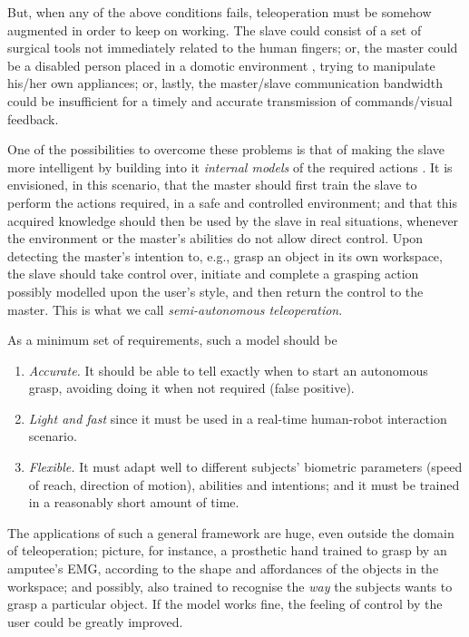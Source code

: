 \documentclass[a4paper,10pt,conference]{ieeeconf}
\begin{document}
But, when any of the above conditions fails, teleoperation must be
somehow augmented in order to keep on working. The slave could consist
of a set of surgical tools \cite{...} not immediately related to the
human fingers; or, the master could be a disabled person placed in a
domotic environment \cite{...}, trying to manipulate his/her own
appliances; or, lastly, the master/slave communication bandwidth could
be insufficient for a timely and accurate transmission of
commands/visual feedback.

One of the possibilities to overcome these problems is that of making
the slave more intelligent by building into it \emph{internal models}
of the required actions \cite{...}. It is envisioned, in this
scenario, that the master should first train the slave to perform the
actions required, in a safe and controlled environment; and that this
acquired knowledge should then be used by the slave in real
situations, whenever the environment or the master's abilities do not
allow direct control. Upon detecting the master's intention to, e.g.,
grasp an object in its own workspace, the slave should take control
over, initiate and complete a grasping action possibly modelled upon
the user's style, and then return the control to the master. This is
what we call \emph{semi-autonomous teleoperation}.

As a minimum set of requirements, such a model should be

\begin{enumerate}

  \item \emph{Accurate.} It should be able to tell exactly when to
    start an autonomous grasp, avoiding doing it when not required
    (false positive).

  \item \emph{Light and fast} since it must be used in a real-time
    human-robot interaction scenario.

  \item \emph{Flexible.} It must adapt well to different subjects'
    biometric parameters (speed of reach, direction of motion),
    abilities and intentions; and it must be trained in a reasonably
    short amount of time.

\end{enumerate}

The applications of such a general framework are huge, even outside
the domain of teleoperation; picture, for instance, a prosthetic hand
trained to grasp by an amputee's EMG, according to the shape and
affordances of the objects in the workspace; and possibly, also
trained to recognise the \emph{way} the subjects wants to grasp a
particular object. If the model works fine, the feeling of control by
the user could be greatly improved.
\end{document}
